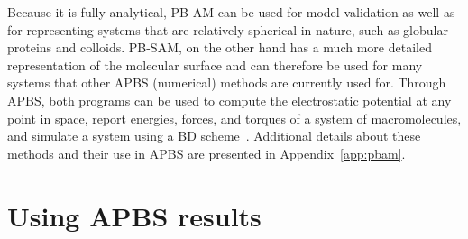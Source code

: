 \documentclass[12pt,titlepage]{article}
\begin{document}
Because it is fully analytical, PB-AM can be used for model validation as well as for representing systems that are relatively spherical in nature, such as globular proteins and colloids.
PB-SAM, on the other hand has a much more detailed representation of the molecular surface and can therefore be used for many systems that other APBS (numerical) methods are currently used for. Through APBS, both programs can be used to compute the electrostatic potential at any point in space, report energies, forces, and torques of a system of macromolecules, and simulate a system using a BD scheme~\cite{Ermak1978}.
Additional details about these methods and their use in APBS are presented in Appendix~\ref{app:pbam}.

\section{Using APBS results}
\end{document}
